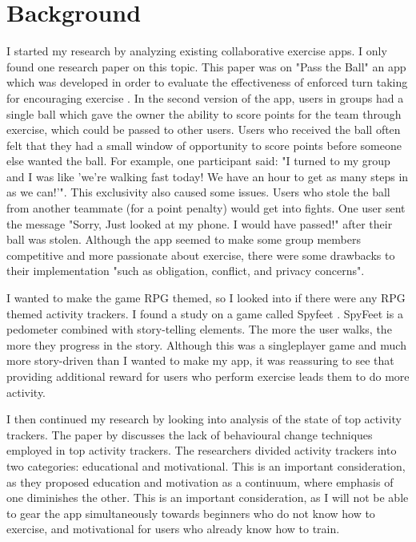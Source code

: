 \documentclass{l4proj}
\begin{document}
\chapter{Background}
I started my research by analyzing existing collaborative exercise apps. I only found one research paper on this topic. This paper was on "Pass the Ball" an app which was developed in order to evaluate the effectiveness of enforced turn taking for encouraging exercise \citep{Pass_the_ball}. In the second version of the app, users in groups had a single ball which gave the owner the ability to score points for the team through exercise, which could be passed to other users. Users who received the ball often felt that they had a small window of opportunity to score points before someone else wanted the ball. For example, one participant said: "I turned to my group and I was like 'we’re walking fast today! We have an hour to get as many steps in as we can!'". This exclusivity also caused some issues. Users who stole the ball from another teammate (for a point penalty) would get into fights. One user sent the message "Sorry, Just looked at my phone. I would have passed!" after their ball was stolen. Although the app seemed to make some group members competitive and more passionate about exercise, there were some drawbacks to their implementation "such as obligation, conflict, and privacy concerns".

I wanted to make the game RPG themed, so I looked into if there were any RPG themed activity trackers. I found a study on a game called Spyfeet \citet{SpyFeet}. SpyFeet is a pedometer combined with story-telling elements. The more the user walks, the more they progress in the story. Although this was a singleplayer game and much more story-driven than I wanted to make my app, it was reassuring to see that providing additional reward for users who perform exercise leads them to do more activity.

I then continued my research by looking into analysis of the state of top activity trackers. The paper by \citet{Behavior_change} discusses the lack of behavioural change techniques employed in top activity trackers. The researchers divided activity trackers into two categories: educational and motivational. This is an important consideration, as they proposed education and motivation as a continuum, where emphasis of one diminishes the other. This is an important consideration, as I will not be able to gear the app simultaneously towards beginners who do not know how to exercise, and motivational for users who already know how to train.
\end{document}
